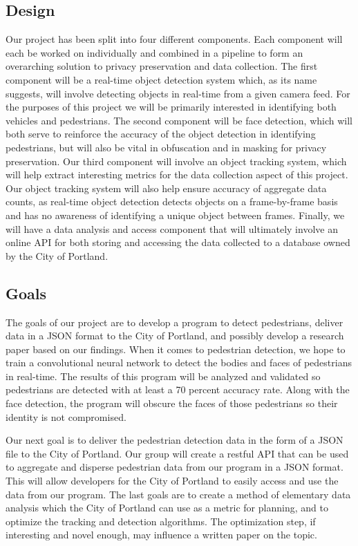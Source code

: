 \documentclass[onecolumn, draftclsnofoot,10pt, compsoc]{IEEEtran}
\begin{document}
\subsection{Design}
Our project has been split into four different components. Each component will each be worked on individually and combined in a pipeline to form an overarching solution to privacy preservation and data collection. The first component will be a real-time object detection system which, as its name suggests, will involve detecting objects in real-time from a given camera feed. For the purposes of this project we will be primarily interested in identifying both vehicles and pedestrians. The second component will be face detection, which will both serve to reinforce the accuracy of the object detection in identifying pedestrians, but will also be vital in obfuscation and in masking for privacy preservation. Our third component will involve an object tracking system, which will help extract interesting metrics for the data collection aspect of this project. Our object tracking system will also help ensure accuracy of aggregate data counts, as real-time object detection detects objects on a frame-by-frame basis and has no awareness of identifying a unique object between frames. Finally, we will have a data analysis and access component that will ultimately involve an online API for both storing and accessing the data collected to a database owned by the City of Portland.

\subsection{Goals}
The goals of our project are to develop a program to detect pedestrians, deliver data in a JSON format to the City of Portland, and possibly develop a research paper based on our findings. When it comes to pedestrian detection, we hope to train a convolutional neural network to detect the bodies and faces of pedestrians in real-time. The results of this program will be analyzed and validated so pedestrians are detected with at least a 70 percent accuracy rate. Along with the face detection, the program will obscure the faces of those pedestrians so their identity is not compromised. 

Our next goal is to deliver the pedestrian detection data in the form of a JSON file to the City of Portland. Our group will create a restful API that can be used to aggregate and disperse pedestrian data from our program in a JSON format. This will allow developers for the City of Portland to easily access and use the data from our program. The last goals are to create a method of elementary data analysis which the City of Portland can use as a metric for planning, and to optimize the tracking and detection algorithms. The optimization step, if interesting and novel enough, may influence a written paper on the topic.
\end{document}
